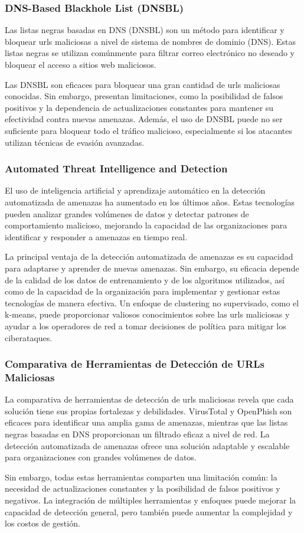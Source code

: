 \subsubsection*{DNS-Based Blackhole List (DNSBL)}
Las listas negras basadas en DNS (DNSBL) son un método para identificar y bloquear \glspl{url} maliciosas a nivel de sistema de nombres de dominio (DNS). Estas listas negras se utilizan comúnmente para filtrar correo electrónico no deseado y bloquear el acceso a sitios web maliciosos\autocite{fejrskov2021using}.

Las DNSBL son eficaces para bloquear una gran cantidad de \glspl{url} maliciosas conocidas. Sin embargo, presentan limitaciones, como la posibilidad de falsos positivos y la dependencia de actualizaciones constantes para mantener su efectividad contra nuevas amenazas. Además, el uso de DNSBL puede no ser suficiente para bloquear todo el tráfico malicioso, especialmente si los atacantes utilizan técnicas de evasión avanzadas.

\subsubsection*{Automated Threat Intelligence and Detection}
El uso de inteligencia artificial y aprendizaje automático en la detección automatizada de amenazas ha aumentado en los últimos años. Estas tecnologías pueden analizar grandes volúmenes de datos y detectar patrones de comportamiento malicioso, mejorando la capacidad de las organizaciones para identificar y responder a amenazas en tiempo real\autocite{ieee2020threat}.

La principal ventaja de la detección automatizada de amenazas es su capacidad para adaptarse y aprender de nuevas amenazas. Sin embargo, su eficacia depende de la calidad de los datos de entrenamiento y de los algoritmos utilizados, así como de la capacidad de la organización para implementar y gestionar estas tecnologías de manera efectiva. Un enfoque de clustering no supervisado, como el k-means, puede proporcionar valiosos conocimientos sobre las \glspl{url} maliciosas y ayudar a los operadores de red a tomar decisiones de política para mitigar los ciberataques\autocite{ieee2020threat}.

\subsubsection*{Comparativa de Herramientas de Detección de URLs Maliciosas}
La comparativa de herramientas de detección de \glspl{url} maliciosas revela que cada solución tiene sus propias fortalezas y debilidades. VirusTotal y OpenPhish son eficaces para identificar una amplia gama de amenazas, mientras que las listas negras basadas en DNS proporcionan un filtrado eficaz a nivel de red. La detección automatizada de amenazas ofrece una solución adaptable y escalable para organizaciones con grandes volúmenes de datos.

Sin embargo, todas estas herramientas comparten una limitación común: la necesidad de actualizaciones constantes y la posibilidad de falsos positivos y negativos. La integración de múltiples herramientas y enfoques puede mejorar la capacidad de detección general, pero también puede aumentar la complejidad y los costos de gestión.
